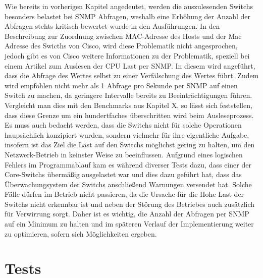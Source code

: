 Wie bereits in vorherigen Kapitel angedeutet, werden die auszulesenden Switchs besonders belastet bei SNMP Abfragen, weshalb eine Erhöhung der Anzahl der Abfragen stehts kritisch bewertet wurde in den Ausführungen. In den Beschreibung zur Zuordnung zwischen MAC-Adresse des Hosts und der Mac Adresse des Swicths von Cisco, wird diese Problematik nicht angesprochen, jedoch gibt es von Cisco weitere Informationen zu der Problematik, speziell bei einem Artikel zum Auslesen der CPU Last per SNMP. In diesem wird angeführt, dass die Abfrage des Wertes selbst zu einer Verfälschung des Wertes führt. Zudem wird empfohlen nicht mehr als 1 Abfrage pro Sekunde per SNMP auf einen Switch zu machen, da geringere Intervalle bereits zu Beeinträchtigungen führen. Vergleicht man dies mit den Benchmarks aus Kapitel X, so lässt sich feststellen, dass diese Grenze um ein hundertfaches überschritten wird beim Ausleseprozess. Es muss auch bedacht werden, dass die Switchs nicht für solche Operationen haupsächlich konzipiert wurden, sondern vielmehr für ihre eigentliche Aufgabe, insofern ist das Ziel die Last auf den Switchs möglichst gering zu halten, um den Netzwerk-Betrieb in keinster Weise zu beeinflussen. Aufgrund eines logischen Fehlers im Programmablauf kam es während diverser Tests dazu, dass einer der Core-Switchs übermäßig ausgelastet war und dies dazu geführt hat, dass das Überwachungsystem der Switchs anschließend Warnungen versendet hat. Solche Fälle dürfen im Betrieb nicht passieren, da die Ursache für die Hohe Last der Switchs nicht erkennbar ist und neben der Störung des Betriebes auch zusätzlich für Verwirrung sorgt. Daher ist es wichtig, die Anzahl der Abfragen per SNMP auf ein Minimum zu halten und im späteren Verlauf der Implementierung weiter zu optimieren, sofern sich Möglichkeiten ergeben.

\section{Tests}
\label{sec:tests}

